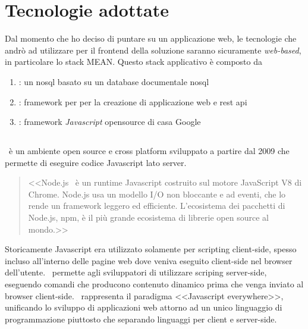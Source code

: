 \section{Tecnologie adottate}
Dal momento che ho deciso di puntare su un applicazione web, le tecnologie che andrò ad utilizzare per il frontend della soluzione saranno sicuramente \textit{web-based}, in particolare lo stack MEAN. Questo stack applicativo è composto da
\begin{enumerate}
	\item \mongodb: un \acrshort{nosql} basato su un database documentale \acrshort{nosql}
	\item \expressjs: framework per \nodejs per la creazione di applicazione web e rest \acrshort{api}
	\item  \angular: framework \textit{Javascript} opensource di casa Google
\end{enumerate}

\subsection{\nodejs}
\nodejs~è un ambiente open source e cross platform sviluppato a partire dal 2009 che permette di eseguire codice Javascript lato server.
\begin{quote}
	<<Node.js\textregistered ~ è un runtime Javascript costruito sul motore JavaScript V8 di Chrome. Node.js usa un modello I/O non bloccante e ad eventi, che lo rende un framework leggero ed efficiente. L'ecosistema dei pacchetti di Node.js, npm, è il più grande ecosistema di librerie open source al mondo.>> \cite{nodejs}
\end{quote}

\noindent
Storicamente Javascript era utilizzato solamente per scripting client-side, spesso incluso all'interno delle pagine web dove veniva eseguito client-side nel browser dell'utente. \nodejs~permette agli sviluppatori di utilizzare scriping server-side, eseguendo comandi che producono contenuto dinamico prima che venga inviato al browser client-side. \nodejs~rappresenta il paradigma <<Javascript everywhere>>\cite{jseverywhere}, unificando lo sviluppo di applicazioni web attorno ad un unico linguaggio di programmazione piuttosto che separando  linguaggi per client e server-side.


